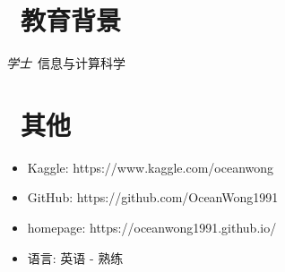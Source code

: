 \documentclass{resume}
\begin{document}
\section{\faGraduationCap\  教育背景}
\textit{学士}\ 信息与计算科学



\section{\faInfo\ 其他}
\begin{itemize}[parsep=0.5ex]
  \item Kaggle: https://www.kaggle.com/oceanwong
  \item GitHub: https://github.com/OceanWong1991
  \item homepage: https://oceanwong1991.github.io/
  \item 语言: 英语 - 熟练
\end{itemize}
\end{document}

